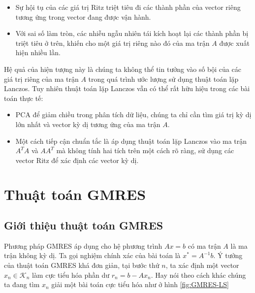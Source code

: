 \documentclass[14pt, a4paper]{article}
\numberwithin{equation}{section}
\numberwithin{algorithm}{section}
\numberwithin{figure}{section}
\numberwithin{dl}{section}
\numberwithin{md}{section}
\numberwithin{bd}{section}
\numberwithin{dn}{section}
\begin{document}
\begin{itemize}
    \item Sự hội tụ của các giá trị Ritz triệt tiêu đi các thành phần của vector riêng tương ứng trong vector đang được vận hành.
    \item Với sai số làm tròn, các nhiễu ngẫu nhiên tái kích hoạt lại các thành phần bị triệt tiêu ở trên, khiến cho một giá trị riêng nào đó của ma trận $A$ được xuất hiện nhiều lần.
\end{itemize}

Hệ quả của hiện tượng này là chúng ta không thể tin tưởng vào số bội của các giá trị riêng của ma trận $A$ trong quá trình ước lượng sử dụng thuật toán lặp Lanczos.
Tuy nhiên thuật toán lặp Lanczos vẫn có thể rất hữu hiệu trong các bài toán thực tế:

\begin{itemize}
    \item PCA để giảm chiều trong phân tích dữ liệu, chúng ta chỉ cần tìm giá trị kỳ dị lớn nhất và vector kỳ dị tương ứng của ma trận $A$.
    \item Một cách tiếp cận chuẩn tắc là áp dụng thuật toán lặp Lanczos vào ma trận $A^T A$ và $A A^T$ mà không tính hai tích trên một cách rõ ràng, sử dụng các vector Ritz để xác định các vector kỳ dị.
\end{itemize}


\section{Thuật toán GMRES}

\subsection{Giới thiệu thuật toán GMRES} \label{GMRES-Introduction}

Phương pháp GMRES áp dụng cho hệ phương trình $Ax=b$ có ma trận $A$ là ma trận không kỳ dị. Ta gọi nghiệm chính xác của bài toán là $x^* = A^{-1}b$. Ý tưởng của thuật toán GMRES khá đơn giản, tại bước thứ $n$, ta xác định một vector $x_n \in \mathcal{K}_n$ làm cực tiểu hóa phần dư $r_n = b - A x_n$. Hay nói theo cách khác chúng ta đang tìm $x_n$ giải một bài toán cực tiểu hóa như ở hình \ref{fig:GMRES-LS}
\end{document}
